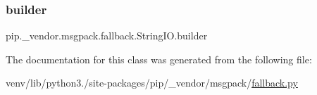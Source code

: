 \subsubsection{\texorpdfstring{builder}{builder}}
{\footnotesize\ttfamily pip.\+\_\+vendor.\+msgpack.\+fallback.\+String\+I\+O.\+builder}



The documentation for this class was generated from the following file\+:\begin{DoxyCompactItemize}
\item 
venv/lib/python3./site-\/packages/pip/\+\_\+vendor/msgpack/\hyperlink{fallback_8py}{fallback.\+py}\end{DoxyCompactItemize}
